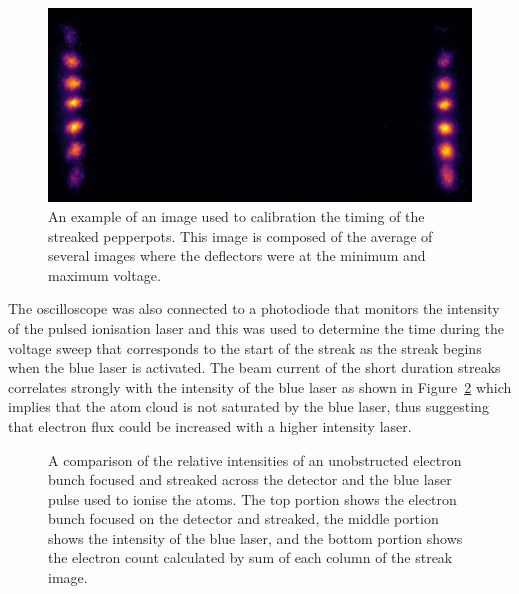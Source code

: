 \begin{figure}
    \center
    \includegraphics[width=0.5\linewidth]{part2/Figs/example_calibration.jpeg}
    \caption[Streaked pepperpot calibration image.]{An example of an image used to calibration the timing of the streaked pepperpots.
    This image is composed of the average of several images where the deflectors were at the minimum and maximum voltage.}
    \label{figure:example_calibration}
\end{figure}

The oscilloscope was also connected to a photodiode that monitors the intensity of the pulsed ionisation laser and this was used to determine the time during the voltage sweep that corresponds to the start of the streak as the streak begins when the blue laser is activated.
The beam current of the short duration streaks correlates strongly with the intensity of the blue laser as shown in Figure~\ref{figure:blue_streak} which implies that the atom cloud is not saturated by the blue laser, thus suggesting that electron flux could be increased with a higher intensity laser.

\begin{figure}
    \center
    
    \caption[Comparison between time-resolved electron count and ionisation laser power.]{A comparison of the relative intensities of an unobstructed electron bunch focused and streaked across the detector and the blue laser pulse used to ionise the atoms.
    The top portion shows the electron bunch focused on the detector and streaked, the middle portion shows the intensity of the blue laser, and the bottom portion shows the electron count calculated by sum of each column of the streak image.}
    \label{figure:blue_streak}
\end{figure}

